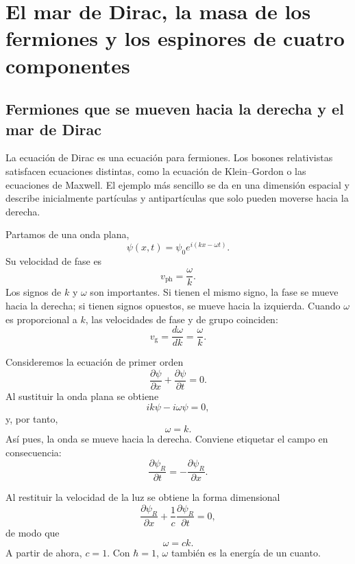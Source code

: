 \chapter{El mar de Dirac, la masa de los fermiones y los espinores de cuatro componentes}

\section{Fermiones que se mueven hacia la derecha y el mar de Dirac}

La ecuación de Dirac es una ecuación para fermiones. Los bosones relativistas satisfacen ecuaciones distintas, como la ecuación de Klein--Gordon o las ecuaciones de Maxwell. El ejemplo más sencillo se da en una dimensión espacial y describe inicialmente partículas y antipartículas que solo pueden moverse hacia la derecha.

Partamos de una onda plana,
\begin{equation}
\psi(x,t)=\psi_0 e^{i(kx-\omega t)}.
\end{equation}
Su velocidad de fase es
\begin{equation}
v_{\mathrm{ph}}=\frac{\omega}{k}.
\end{equation}
Los signos de \(k\) y \(\omega\) son importantes. Si tienen el mismo signo, la fase se mueve hacia la derecha; si tienen signos opuestos, se mueve hacia la izquierda. Cuando \(\omega\) es proporcional a \(k\), las velocidades de fase y de grupo coinciden:
\begin{equation}
v_{\mathrm{g}}=\frac{d\omega}{dk}=\frac{\omega}{k}.
\end{equation}

Consideremos la ecuación de primer orden
\begin{equation}
\frac{\partial\psi}{\partial x}
+
\frac{\partial\psi}{\partial t}
=0.
\end{equation}
Al sustituir la onda plana se obtiene
\begin{equation}
ik\psi-i\omega\psi=0,
\end{equation}
y, por tanto,
\begin{equation}
\omega=k.
\end{equation}
Así pues, la onda se mueve hacia la derecha. Conviene etiquetar el campo en consecuencia:
\begin{equation}
\frac{\partial\psi_R}{\partial t}
=
-\frac{\partial\psi_R}{\partial x}.
\end{equation}

Al restituir la velocidad de la luz se obtiene la forma dimensional
\begin{equation}
\frac{\partial\psi_R}{\partial x}
+
\frac{1}{c}\frac{\partial\psi_R}{\partial t}
=0,
\end{equation}
de modo que
\begin{equation}
\omega=ck.
\end{equation}
A partir de ahora, \(c=1\). Con \(\hbar=1\), \(\omega\) también es la energía de un cuanto.

